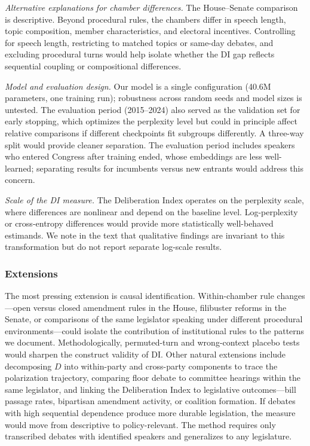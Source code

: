 \documentclass[12pt]{article}
\newcommand{\DI}{\mathit{D}}
\begin{document}
\textit{Alternative explanations for chamber differences.} The House--Senate comparison is descriptive. Beyond procedural rules, the chambers differ in speech length, topic composition, member characteristics, and electoral incentives. Controlling for speech length, restricting to matched topics or same-day debates, and excluding procedural turns would help isolate whether the DI gap reflects sequential coupling or compositional differences.

\textit{Model and evaluation design.} Our model is a single configuration (40.6M parameters, one training run); robustness across random seeds and model sizes is untested. The evaluation period (2015--2024) also served as the validation set for early stopping, which optimizes the perplexity level but could in principle affect relative comparisons if different checkpoints fit subgroups differently. A three-way split would provide cleaner separation. The evaluation period includes speakers who entered Congress after training ended, whose embeddings are less well-learned; separating results for incumbents versus new entrants would address this concern.

\textit{Scale of the DI measure.} The Deliberation Index operates on the perplexity scale, where differences are nonlinear and depend on the baseline level. Log-perplexity or cross-entropy differences would provide more statistically well-behaved estimands. We note in the text that qualitative findings are invariant to this transformation but do not report separate log-scale results.

\subsubsection*{Extensions} The most pressing extension is causal identification. Within-chamber rule changes---open versus closed amendment rules in the House, filibuster reforms in the Senate, or comparisons of the same legislator speaking under different procedural environments---could isolate the contribution of institutional rules to the patterns we document. Methodologically, permuted-turn and wrong-context placebo tests would sharpen the construct validity of DI. Other natural extensions include decomposing $\DI$ into within-party and cross-party components to trace the polarization trajectory, comparing floor debate to committee hearings within the same legislator, and linking the Deliberation Index to legislative outcomes---bill passage rates, bipartisan amendment activity, or coalition formation. If debates with high sequential dependence produce more durable legislation, the measure would move from descriptive to policy-relevant. The method requires only transcribed debates with identified speakers and generalizes to any legislature.
\end{document}
